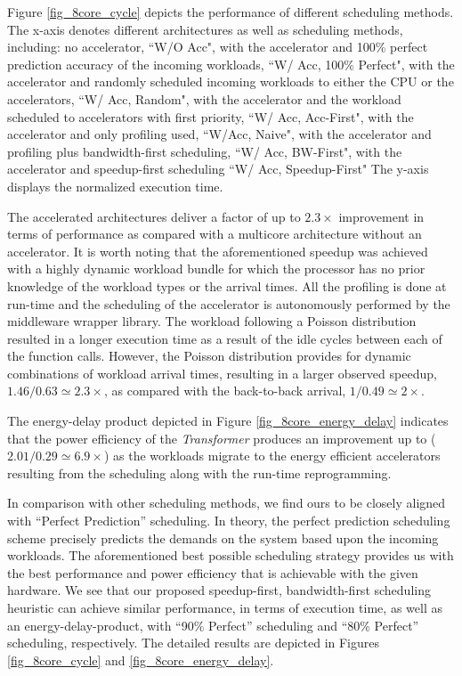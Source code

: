 Figure \ref{fig_8core_cycle} depicts the performance of different
scheduling methods. The x-axis denotes different
architectures as well as scheduling methods, including:
 no accelerator, ``W/O Acc",
 with the accelerator and 100\% perfect prediction accuracy of the incoming workloads, ``W/ Acc, 100\% Perfect",
 with the accelerator and randomly scheduled incoming workloads to either the CPU or the accelerators, ``W/ Acc, Random",
 with the accelerator and the workload scheduled to accelerators with first priority, ``W/ Acc, Acc-First",
 with the accelerator and only profiling used, ``W/Acc, Naive", 
 with the accelerator and profiling plus bandwidth-first scheduling, ``W/ Acc, BW-First",
 with the accelerator and speedup-first scheduling ``W/ Acc, Speedup-First"
 The y-axis displays the normalized execution time.

The accelerated architectures deliver a factor of up to $2.3\times$ improvement in terms of performance as 
compared with a multicore architecture without an accelerator. It is
worth noting that the aforementioned speedup was achieved with a highly dynamic
workload bundle for which the processor has no prior knowledge of the
workload types or the arrival times. All the profiling is done at run-time and the
scheduling of the accelerator is autonomously performed by the
middleware wrapper library. The workload following a Poisson distribution
 resulted in a longer execution time as a result of the idle cycles
between each of the function calls. However, the Poisson distribution provides for dynamic
 combinations of workload arrival times, resulting in a
 larger observed speedup, $1.46/0.63\simeq2.3\times$, as compared with the
back-to-back arrival, $1/0.49\simeq2\times$. 

The energy-delay product depicted in Figure
\ref{fig_8core_energy_delay} indicates that the power efficiency of the {\em
 Transformer} produces an improvement up to ($2.01/0.29\simeq6.9\times$) as the workloads migrate to
the energy efficient accelerators resulting from the scheduling along with the run-time
reprogramming.



In comparison with other scheduling methods, we find ours
to be closely aligned with ``Perfect Prediction'' scheduling. In theory, the perfect
prediction scheduling scheme precisely predicts
the demands on the system based upon the incoming workloads. The aforementioned best possible scheduling
strategy provides us with the best performance and power
efficiency that is achievable with the given hardware. We see that our proposed speedup-first, bandwidth-first scheduling heuristic can
 achieve similar performance, in terms of execution time, as well as an energy-delay-product, with ``90\% Perfect'' scheduling and 
``80\% Perfect'' scheduling, respectively. The detailed
results are depicted in Figures \ref{fig_8core_cycle} and \ref{fig_8core_energy_delay}.  

